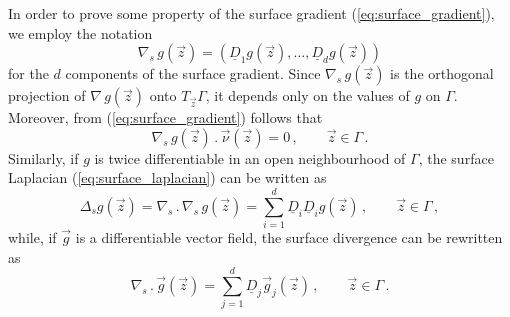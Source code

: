 In order to prove some property of the surface gradient
(\ref{eq:surface_gradient}), we employ the notation
\begin{equation}
\nabla_s \, g(\vec z) = (\underline{D}_1 g(\vec z), \hdots, \underline{D}_{d}
g(\vec z))
\end{equation}
for the $d$ components of the surface gradient. Since $\nabla_s \, g(\vec z)$
is the orthogonal projection of $\nabla \, g(\vec z)$ onto $T_{\vec z} \Gamma$,
it depends only on the values of $g$ on $\Gamma$. Moreover, from
(\ref{eq:surface_gradient}) follows that
\begin{equation}\label{eq:surface_gradient_comp}
\nabla_s \, g(\vec z) \,.\, \vec{\nu}(\vec z)=0\,, \qquad \vec z \in \Gamma\,.
\end{equation}
Similarly, if $g$ is twice differentiable in an open neighbourhood of
$\Gamma$, the surface Laplacian (\ref{eq:surface_laplacian}) can be written as
\begin{equation}\label{eq:surface_laplacian_comp}
\Delta_s g(\vec z) = \nabla_s\, . \,\nabla_s \, g(\vec z) =
\sum_{i = 1}^d \underline{D}_i \underline{D}_i g(\vec z) \, ,
\qquad \vec z \in \Gamma \, ,
\end{equation}
while, if $\vec g$ is a differentiable vector field, the surface divergence
can be rewritten as
\begin{equation}
\nabla_s \,.\, \vec g(\vec z) = \sum_{j = 1}^{d} \underline{D}_j \vec g_j
(\vec z)\,, \qquad \vec z \in \Gamma\,.
\end{equation}

